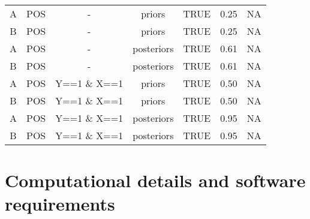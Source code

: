 \documentclass[
  11pt,
  article]{jss}
\begin{document}
\begin{longtable}[t]{ccccccc}
A & POS & - & priors & TRUE & 0.25 & NA\\
\addlinespace
B & POS & - & priors & TRUE & 0.25 & NA\\
A & POS & - & posteriors & TRUE & 0.61 & NA\\
B & POS & - & posteriors & TRUE & 0.61 & NA\\
A & POS & Y==1 \& X==1 & priors & TRUE & 0.50 & NA\\
B & POS & Y==1 \& X==1 & priors & TRUE & 0.50 & NA\\
\addlinespace
A & POS & Y==1 \& X==1 & posteriors & TRUE & 0.95 & NA\\
B & POS & Y==1 \& X==1 & posteriors & TRUE & 0.95 & NA\\
\bottomrule

\end{longtable}

\FloatBarrier

\newpage{}

\section*{Computational details and software
requirements}\label{computational-details-and-software-requirements}
\end{document}
